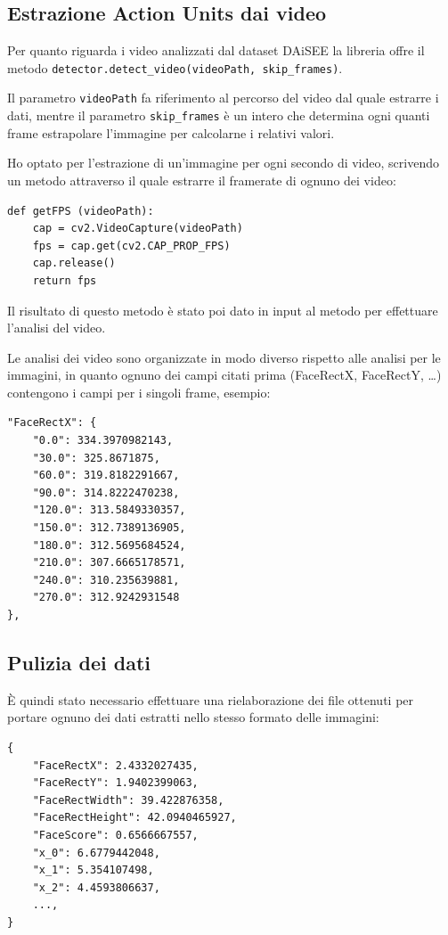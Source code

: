 \subsection{Estrazione Action Units dai video}
Per quanto riguarda i video analizzati dal dataset DAiSEE la libreria offre il metodo \texttt{detector.detect_video(videoPath, skip_frames)}.

Il parametro \texttt{videoPath} fa riferimento al percorso del video dal quale estrarre i dati, mentre il parametro \texttt{skip_frames} è un intero che determina ogni quanti frame estrapolare l’immagine per calcolarne i relativi valori.

Ho optato per l’estrazione di un’immagine per ogni secondo di video, scrivendo un metodo attraverso il quale estrarre il framerate di ognuno dei video:
\begin{verbatim}
def getFPS (videoPath):
    cap = cv2.VideoCapture(videoPath)
    fps = cap.get(cv2.CAP_PROP_FPS)
    cap.release()
    return fps
\end{verbatim}
Il risultato di questo metodo è stato poi dato in input al metodo per effettuare l’analisi del video.

Le analisi dei video sono organizzate in modo diverso rispetto alle analisi per le immagini, in quanto ognuno dei campi citati prima (FaceRectX, FaceRectY, …) contengono i campi per i singoli frame, esempio:
\begin{verbatim}
"FaceRectX": {
    "0.0": 334.3970982143,
    "30.0": 325.8671875,
    "60.0": 319.8182291667,
    "90.0": 314.8222470238,
    "120.0": 313.5849330357,
    "150.0": 312.7389136905,
    "180.0": 312.5695684524,
    "210.0": 307.6665178571,
    "240.0": 310.235639881,
    "270.0": 312.9242931548
},
\end{verbatim}

\subsection{Pulizia dei dati}
È quindi stato necessario effettuare una rielaborazione dei file ottenuti per portare ognuno dei dati estratti nello stesso formato delle immagini:
\begin{verbatim}
{
    "FaceRectX": 2.4332027435,
    "FaceRectY": 1.9402399063,
    "FaceRectWidth": 39.422876358,
    "FaceRectHeight": 42.0940465927,
    "FaceScore": 0.6566667557,
    "x_0": 6.6779442048,
    "x_1": 5.354107498,
    "x_2": 4.4593806637,
    ...,
}
\end{verbatim}

